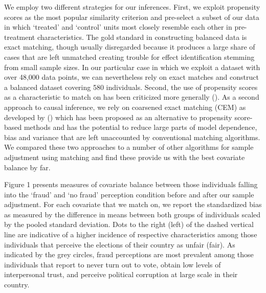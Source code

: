 \documentclass[11pt, ngerman,english,a4]{article}
\begin{document}
We employ two different strategies for our inferences. First, we exploit propensity scores as the most popular similarity criterion and pre-select a subset of our data in which `treated’ and `control’ units most closely resemble each other in pre-treatment characteristics. The gold standard in constructing balanced data is exact matching, though usually disregarded because it produces a large share of cases that are left unmatched creating trouble for effect identification stemming from small sample sizes. In our particular case in which we exploit a dataset with over 48,000 data points, we can nevertheless rely on exact matches and construct a balanced dataset covering 580 individuals. Second, the use of propensity scores as a characteristic to match on has been criticized more generally (\citealt{King2019}). As a second approach to causal inference, we rely on coarsened exact matching (CEM) as developed by (\citealt{Iacus2012}) which has been proposed as an alternative to propensity score-based methods and has the potential to reduce large parts of model dependence, bias and variance that are left unaccounted by conventional matching algorithms. We compared these two approaches to a number of other algorithms for sample adjustment using matching and find these provide us with the best covariate balance by far. 

Figure 1 presents measures of covariate balance between those individuals falling into the `fraud’ and `no fraud’ perception condition before and after our sample adjustment. For each covariate that we match on, we report the standardized bias as measured by the difference in means between both groups of individuals scaled by the pooled standard deviation. Dots to the right (left) of the dashed vertical line are indicative of a higher incidence of respective characteristics among those individuals that perceive the elections of their country as unfair (fair). As indicated by the grey circles, fraud perceptions are most prevalent among those individuals that report to never turn out to vote, obtain low levels of interpersonal trust, and perceive political corruption at large scale in their country. 
\end{document}
